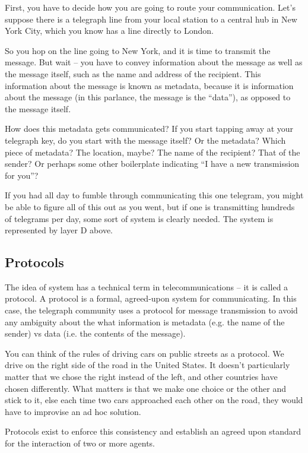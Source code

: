 \documentclass[UTF8]{book}
\begin{document}
\begin{CJK}{UTF8}{gbsn}
First, you have to decide how you are going to route your communication. Let's suppose there is a telegraph line from your local station to a central hub in New York City, which you know has a line directly to London.

So you hop on the line going to New York, and it is time to transmit the message. But wait – you have to convey information about the message as well as the message itself, such as the name and address of the recipient. This information about the message is known as metadata, because it is information about the message (in this parlance, the message is the “data”), as opposed to the message itself.

How does this metadata gets communicated? If you start tapping away at your telegraph key, do you start with the message itself? Or the metadata? Which piece of metadata? The location, maybe? The name of the recipient? That of the sender? Or perhaps some other boilerplate indicating “I have a new transmission for you”?

If you had all day to fumble through communicating this one telegram, you might be able to figure all of this out as you went, but if one is transmitting hundreds of telegrams per day, some sort of system is clearly needed. The system is represented by layer D above.

\subsection{Protocols}

The idea of system has a technical term in telecommunications – it is called a protocol. A protocol is a formal, agreed-upon system for communicating. In this case, the telegraph community uses a protocol for message transmission to avoid any ambiguity about the what information is metadata (e.g. the name of the sender) vs data (i.e. the contents of the message).

You can think of the rules of driving cars on public streets as a protocol. We drive on the right side of the road in the United States. It doesn't particularly matter that we chose the right instead of the left, and other countries have chosen differently. What matters is that we make one choice or the other and stick to it, else each time two cars approached each other on the road, they would have to improvise an ad hoc solution.

Protocols exist to enforce this consistency and establish an agreed upon standard for the interaction of two or more agents.


\end{CJK}
\end{document}
